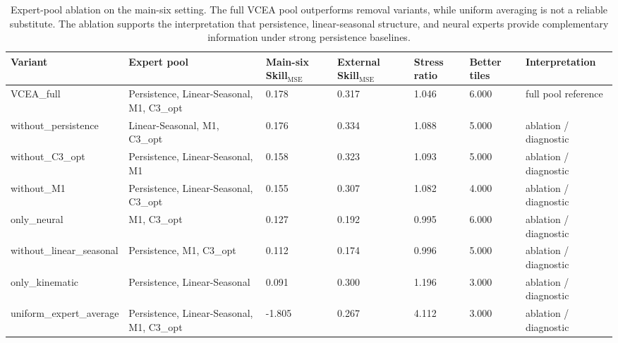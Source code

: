 \begin{table}[t]
\centering
\footnotesize
\begin{tabular}{lllllll}
\toprule
Variant & Expert pool & Main-six Skill$_{\mathrm{MSE}}$ & External Skill$_{\mathrm{MSE}}$ & Stress ratio & Better tiles & Interpretation \\
\midrule
VCEA\_full & Persistence, Linear-Seasonal, M1, C3\_opt & 0.178 & 0.317 & 1.046 & 6.000 & full pool reference \\
without\_persistence & Linear-Seasonal, M1, C3\_opt & 0.176 & 0.334 & 1.088 & 5.000 & ablation / diagnostic \\
without\_C3\_opt & Persistence, Linear-Seasonal, M1 & 0.158 & 0.323 & 1.093 & 5.000 & ablation / diagnostic \\
without\_M1 & Persistence, Linear-Seasonal, C3\_opt & 0.155 & 0.307 & 1.082 & 4.000 & ablation / diagnostic \\
only\_neural & M1, C3\_opt & 0.127 & 0.192 & 0.995 & 6.000 & ablation / diagnostic \\
without\_linear\_seasonal & Persistence, M1, C3\_opt & 0.112 & 0.174 & 0.996 & 5.000 & ablation / diagnostic \\
only\_kinematic & Persistence, Linear-Seasonal & 0.091 & 0.300 & 1.196 & 3.000 & ablation / diagnostic \\
uniform\_expert\_average & Persistence, Linear-Seasonal, M1, C3\_opt & -1.805 & 0.267 & 4.112 & 3.000 & ablation / diagnostic \\
\bottomrule
\end{tabular}
\caption{Expert-pool ablation on the main-six setting. The full VCEA pool outperforms removal variants, while uniform averaging is not a reliable substitute. The ablation supports the interpretation that persistence, linear-seasonal structure, and neural experts provide complementary information under strong persistence baselines.}
\label{tab:e2_expert_ablation_main6}
\end{table}
